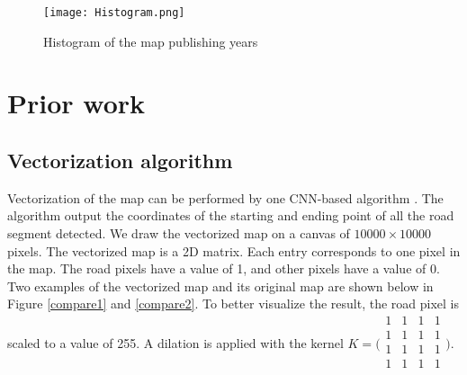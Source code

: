 \begin{figure}[h!]
\centering
\texttt{[image: Histogram.png]}
\caption{Histogram of the map publishing years}
\label{his}
\end{figure}

\section{Prior work}

\subsection{Vectorization algorithm}

Vectorization of the map can be performed by one CNN-based algorithm \cite{remi_petitpierre}. The algorithm output the coordinates of the starting and ending point of all the road segment detected. We draw the vectorized map on a canvas of $10000 \times 10000$ pixels. The vectorized map is a 2D matrix. Each entry corresponds to one pixel in the map. The road pixels have a value of 1, and other pixels have a value of 0. Two examples of the vectorized map and its original map are shown below in Figure \ref{compare1} and \ref{compare2}. To better visualize the result, the road pixel is scaled to a value of 255. A dilation is applied with the kernel 
$K = \bigg(\begin{smallmatrix}
  1 & 1 & 1 & 1\\
  1 & 1 & 1 & 1\\
  1 & 1 & 1 & 1\\
  1 & 1 & 1 & 1\\
\end{smallmatrix}\bigg)$.

